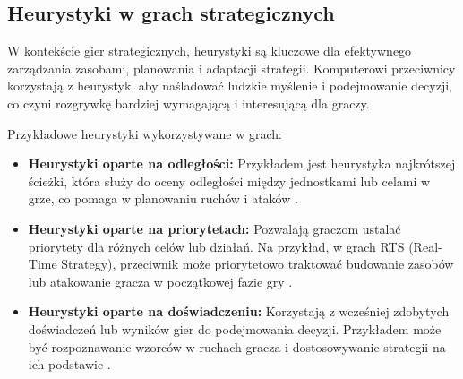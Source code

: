 \subsection{Heurystyki w grach strategicznych}
W kontekście gier strategicznych, heurystyki są kluczowe dla efektywnego zarządzania zasobami, planowania i adaptacji strategii. Komputerowi przeciwnicy korzystają z heurystyk, aby naśladować ludzkie myślenie i podejmowanie decyzji, co czyni rozgrywkę bardziej wymagającą i interesującą dla graczy.

Przykładowe heurystyki wykorzystywane w grach:
\begin{itemize}
  \item \textbf{Heurystyki oparte na odległości:} Przykładem jest heurystyka najkrótszej ścieżki, która służy do oceny odległości między jednostkami lub celami w grze, co pomaga w planowaniu ruchów i ataków \cite{inproceedings}.
  \item \textbf{Heurystyki oparte na priorytetach:} Pozwalają graczom ustalać priorytety dla różnych celów lub działań. Na przykład, w grach RTS (Real-Time Strategy), przeciwnik może priorytetowo traktować budowanie zasobów lub atakowanie gracza w początkowej fazie gry \cite{Ontan2013ASO}.
  \item \textbf{Heurystyki oparte na doświadczeniu:} Korzystają z wcześniej zdobytych doświadczeń lub wyników gier do podejmowania decyzji. Przykładem może być rozpoznawanie wzorców w ruchach gracza i dostosowywanie strategii na ich podstawie \cite{Weber_Mateas_Jhala_2011}.
\end{itemize}

